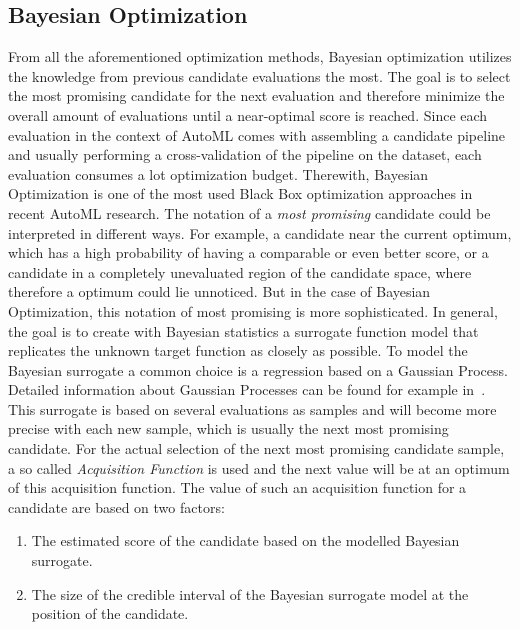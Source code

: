 \subsection{Bayesian Optimization}
\label{sec:theory:optimization:bayesian}
From all the aforementioned optimization methods, Bayesian optimization utilizes the knowledge from previous candidate evaluations the most.
The goal is to select the most promising candidate for the next evaluation and therefore minimize the overall amount of evaluations until a near-optimal score is reached.
Since each evaluation in the context of AutoML comes with assembling a candidate pipeline and usually performing a cross-validation of the pipeline on the dataset, each evaluation consumes a lot optimization budget.
Therewith, Bayesian Optimization is one of the most used Black Box optimization approaches in recent AutoML research.\newline
The notation of a \textit{most promising} candidate could be interpreted in different ways.
For example, a candidate near the current optimum, which has a high probability of having a comparable or even better score, or a candidate in a completely unevaluated region of the candidate space, where therefore a optimum could lie unnoticed.
But in the case of Bayesian Optimization, this notation of most promising is more sophisticated.\newline
In general, the goal is to create with Bayesian statistics a surrogate function model that replicates the unknown target function as closely as possible.
To model the Bayesian surrogate a common choice is a regression based on a Gaussian Process.
Detailed information about Gaussian Processes can be found for example in~\cite{Rasmussen-Gaussian-Processes}.\newline
This surrogate is based on several evaluations as samples and will become more precise with each new sample, which is usually the next most promising candidate.
For the actual selection of the next most promising candidate sample, a so called \textit{Acquisition Function} is used and the next value will be at an optimum of this acquisition function.
The value of such an acquisition function for a candidate are based on two factors:
\begin{enumerate}
    \item The estimated score of the candidate based on the modelled Bayesian surrogate.
    \item The size of the credible interval of the Bayesian surrogate model at the position of the candidate.
\end{enumerate}
